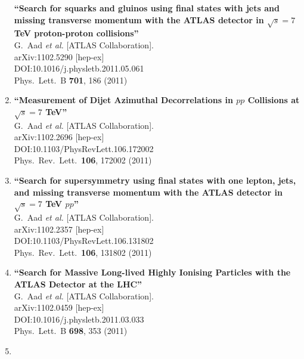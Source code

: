 \documentclass{article}
\begin{document}
\begin{enumerate}
{\bf ``Search for squarks and gluinos using final states with jets and missing transverse momentum with the ATLAS detector in $\sqrt{s}=7$ TeV proton-proton collisions''}
  \\{}G.~Aad {\it et al.} [ATLAS Collaboration].
  \\{}arXiv:1102.5290 [hep-ex]
  \\{}DOI:10.1016/j.physletb.2011.05.061
  \\{}Phys.\ Lett.\ B {\bf 701}, 186 (2011)
\item%
{\bf ``Measurement of Dijet Azimuthal Decorrelations in $pp$ Collisions at $\sqrt{s}=7$ TeV''}
  \\{}G.~Aad {\it et al.} [ATLAS Collaboration].
  \\{}arXiv:1102.2696 [hep-ex]
  \\{}DOI:10.1103/PhysRevLett.106.172002
  \\{}Phys.\ Rev.\ Lett.\  {\bf 106}, 172002 (2011)
\item%
{\bf ``Search for supersymmetry using final states with one lepton, jets, and missing transverse momentum with the ATLAS detector in $\sqrt{s}=7$ TeV $pp$''}
  \\{}G.~Aad {\it et al.} [ATLAS Collaboration].
  \\{}arXiv:1102.2357 [hep-ex]
  \\{}DOI:10.1103/PhysRevLett.106.131802
  \\{}Phys.\ Rev.\ Lett.\  {\bf 106}, 131802 (2011)
\item%
{\bf ``Search for Massive Long-lived Highly Ionising Particles with the ATLAS Detector at the LHC''}
  \\{}G.~Aad {\it et al.} [ATLAS Collaboration].
  \\{}arXiv:1102.0459 [hep-ex]
  \\{}DOI:10.1016/j.physletb.2011.03.033
  \\{}Phys.\ Lett.\ B {\bf 698}, 353 (2011)
\item%

\end{enumerate}
\end{document}

